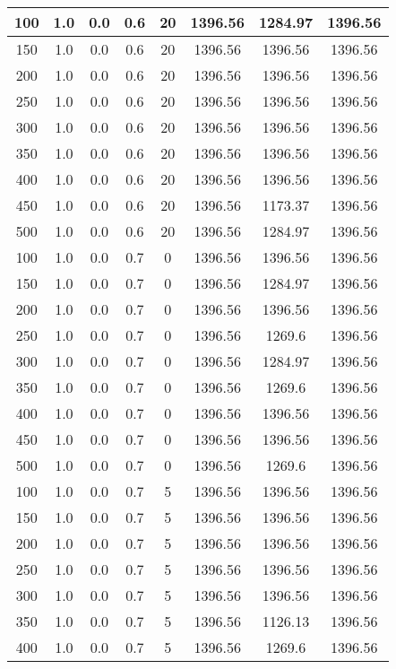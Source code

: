 \documentclass[a4paper, 12pt]{extreport}
\begin{document}
\begin{itemize}
\begin{longtable}{|c|c|c|c|c|c|c|c|}
			100 & 1.0 & 0.0 & 0.6 & 20 & 1396.56 & 1284.97 & 1396.56 \\\hline
			150 & 1.0 & 0.0 & 0.6 & 20 & 1396.56 & 1396.56 & 1396.56 \\\hline
			200 & 1.0 & 0.0 & 0.6 & 20 & 1396.56 & 1396.56 & 1396.56 \\\hline
			250 & 1.0 & 0.0 & 0.6 & 20 & 1396.56 & 1396.56 & 1396.56 \\\hline
			300 & 1.0 & 0.0 & 0.6 & 20 & 1396.56 & 1396.56 & 1396.56 \\\hline
			350 & 1.0 & 0.0 & 0.6 & 20 & 1396.56 & 1396.56 & 1396.56 \\\hline
			400 & 1.0 & 0.0 & 0.6 & 20 & 1396.56 & 1396.56 & 1396.56 \\\hline
			450 & 1.0 & 0.0 & 0.6 & 20 & 1396.56 & 1173.37 & 1396.56 \\\hline
			500 & 1.0 & 0.0 & 0.6 & 20 & 1396.56 & 1284.97 & 1396.56 \\\hline
			100 & 1.0 & 0.0 & 0.7 & 0 & 1396.56 & 1396.56 & 1396.56 \\\hline
			150 & 1.0 & 0.0 & 0.7 & 0 & 1396.56 & 1284.97 & 1396.56 \\\hline
			200 & 1.0 & 0.0 & 0.7 & 0 & 1396.56 & 1396.56 & 1396.56 \\\hline
			250 & 1.0 & 0.0 & 0.7 & 0 & 1396.56 & 1269.6 & 1396.56 \\\hline
			300 & 1.0 & 0.0 & 0.7 & 0 & 1396.56 & 1284.97 & 1396.56 \\\hline
			350 & 1.0 & 0.0 & 0.7 & 0 & 1396.56 & 1269.6 & 1396.56 \\\hline
			400 & 1.0 & 0.0 & 0.7 & 0 & 1396.56 & 1396.56 & 1396.56 \\\hline
			450 & 1.0 & 0.0 & 0.7 & 0 & 1396.56 & 1396.56 & 1396.56 \\\hline
			500 & 1.0 & 0.0 & 0.7 & 0 & 1396.56 & 1269.6 & 1396.56 \\\hline
			100 & 1.0 & 0.0 & 0.7 & 5 & 1396.56 & 1396.56 & 1396.56 \\\hline
			150 & 1.0 & 0.0 & 0.7 & 5 & 1396.56 & 1396.56 & 1396.56 \\\hline
			200 & 1.0 & 0.0 & 0.7 & 5 & 1396.56 & 1396.56 & 1396.56 \\\hline
			250 & 1.0 & 0.0 & 0.7 & 5 & 1396.56 & 1396.56 & 1396.56 \\\hline
			300 & 1.0 & 0.0 & 0.7 & 5 & 1396.56 & 1396.56 & 1396.56 \\\hline
			350 & 1.0 & 0.0 & 0.7 & 5 & 1396.56 & 1126.13 & 1396.56 \\\hline
			400 & 1.0 & 0.0 & 0.7 & 5 & 1396.56 & 1269.6 & 1396.56 \\\hline

\end{longtable}
\end{itemize}
\end{document}
